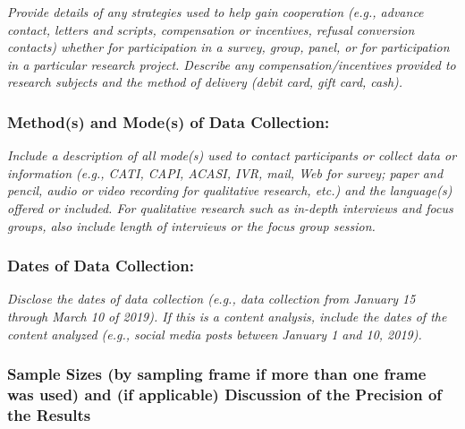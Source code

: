 \documentclass{article}
\begin{document}
\textit{Provide details of any strategies used to help gain cooperation (e.g.,
    advance contact, letters and scripts, compensation or incentives, refusal
    conversion contacts) whether for participation in a survey, group, panel, or
    for participation in a particular research project. Describe any
    compensation/incentives provided to research subjects and the method of
    delivery (debit card, gift card, cash).}

\subsubsection*{Method(s) and Mode(s) of Data Collection:} \textit{Include a
    description of all mode(s) used to contact participants or collect data or
    information (e.g., CATI, CAPI, ACASI, IVR, mail, Web for survey; paper and
    pencil, audio or video recording for qualitative research, etc.) and the
    language(s) offered or included. For qualitative research such as in-depth
    interviews and focus groups, also include length of interviews or the focus
    group session.}

\subsubsection*{Dates of Data Collection:} \textit{Disclose the dates of data
    collection (e.g., data collection from January 15 through March 10 of 2019). If
    this is a content analysis, include the dates of the content analyzed (e.g.,
    social media posts between January 1 and 10, 2019).}

\subsubsection*{Sample Sizes (by sampling frame if more than one frame was
    used) and (if applicable) Discussion of the Precision of the Results}
\end{document}
